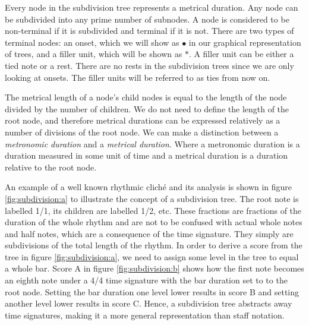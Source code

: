 Every node in the subdivision tree represents a metrical duration. Any node can be subdivided into any prime number of subnodes. A node is considered to be non-terminal if it is subdivided and terminal if it is not. There are two types of terminal nodes: an onset, which we will show as $\bullet$ in our graphical representation of trees, and a filler unit, which will be shown as $*$. A filler unit can be either a tied note or a rest. There are no rests in the subdivision trees since we are only looking at onsets. The filler units will be referred to as ties from now on.

The metrical length of a node's child nodes is equal to the length of the node divided by the number of children. We do not need to define the length of the root node, and therefore metrical durations can be expressed relatively as a number of divisions of the root node. We can make a distinction between a \textit{metronomic duration} and a \textit{metrical duration}. Where a metronomic duration is a duration measured in some unit of time and a metrical duration is a duration relative to the root node. 

An example of a well known rhythmic clich\'e and its analysis is shown in figure \ref{fig:subdivision:a} to illustrate the concept of a subdivision tree. The root note is labelled 1/1,  its children are labelled 1/2, etc. These fractions are fractions of the duration of the whole rhythm and are not to be confused with actual whole notes and half notes, which are a consequence of the time signature. They simply are subdivisions of the total length of the rhythm. In order to derive a score from the tree in figure \ref{fig:subdivision:a}, we need to assign some level in the tree to equal a whole bar. Score A in figure \ref{fig:subdivision:b} shows how the first note becomes an eighth note under a 4/4 time signature with the bar duration set to to the root node. Setting the bar duration one level lower results in score B and setting another level lower results in score C. Hence, a subdivision tree abstracts away time signatures, making it a more general representation than staff notation.

